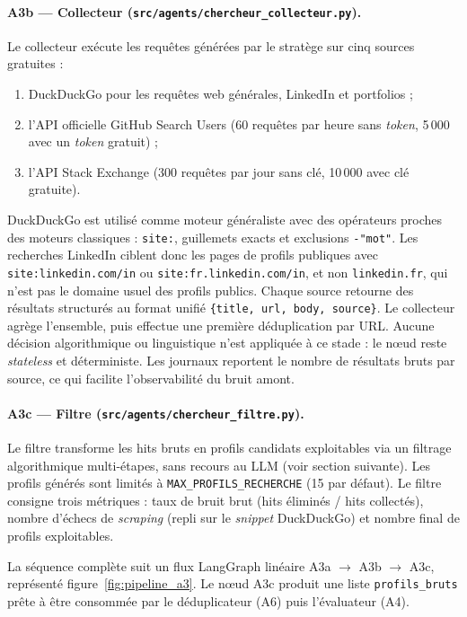 \paragraph{A3b — Collecteur (\texttt{src/agents/chercheur\_collecteur.py}).}
Le collecteur exécute les requêtes générées par le stratège sur cinq sources gratuites :
\begin{enumerate}
\item DuckDuckGo pour les requêtes web générales, LinkedIn et portfolios ;
\item l'API officielle GitHub Search Users (60 requêtes par heure sans \textit{token}, 5\,000 avec un \textit{token} gratuit) ;
\item l'API Stack Exchange (300 requêtes par jour sans clé, 10\,000 avec clé gratuite).
\end{enumerate}
DuckDuckGo est utilisé comme moteur généraliste avec des opérateurs proches des moteurs classiques : \texttt{site:}, guillemets exacts et exclusions \texttt{-"mot"}. Les recherches LinkedIn ciblent donc les pages de profils publiques avec \texttt{site:linkedin.com/in} ou \texttt{site:fr.linkedin.com/in}, et non \texttt{linkedin.fr}, qui n'est pas le domaine usuel des profils publics. Chaque source retourne des résultats structurés au format unifié \texttt{\{title, url, body, source\}}. Le collecteur agrège l'ensemble, puis effectue une première déduplication par URL. Aucune décision algorithmique ou linguistique n'est appliquée à ce stade : le nœud reste \textit{stateless} et déterministe. Les journaux reportent le nombre de résultats bruts par source, ce qui facilite l'observabilité du bruit amont.

\paragraph{A3c — Filtre (\texttt{src/agents/chercheur\_filtre.py}).}
Le filtre transforme les hits bruts en profils candidats exploitables via un filtrage algorithmique multi-étapes, sans recours au LLM (voir section suivante). Les profils générés sont limités à \texttt{MAX\_PROFILS\_RECHERCHE} (15 par défaut). Le filtre consigne trois métriques : taux de bruit brut (hits éliminés / hits collectés), nombre d'échecs de \textit{scraping} (repli sur le \textit{snippet} DuckDuckGo) et nombre final de profils exploitables.

La séquence complète suit un flux LangGraph linéaire A3a \(\rightarrow\) A3b \(\rightarrow\) A3c, représenté figure~\ref{fig:pipeline_a3}. Le nœud A3c produit une liste \texttt{profils\_bruts} prête à être consommée par le déduplicateur (A6) puis l'évaluateur (A4).

